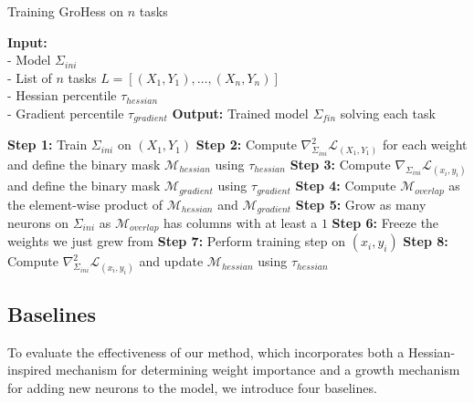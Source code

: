 \documentclass[11pt]{article}
\begin{document}
\begin{algorithm*}
    \caption{Training GroHess on $n$ tasks}
    \begin{algorithmic}[1]
    \State \textbf{Input:} \\
    - Model $\Sigma_{ini}$ \\ 
    - List of $n$ tasks $L = [(X_1,Y_1), \ldots, (X_n,Y_n)]$\\
    - Hessian percentile $\tau_{hessian}$ \\
    - Gradient percentile $\tau_{gradient}$
    \State \textbf{Output:} Trained model $\Sigma_{fin}$ solving each task
    \State
    
    \State \textbf{Step 1:} Train $\Sigma_{ini}$ on $(X_1,Y_1)$
    \State \textbf{Step 2:} Compute $\nabla^2_{\Sigma_{ini}} \mathcal{L}_{(X_1,Y_1)}$ for each weight and define the binary mask $\mathcal{M}_{hessian}$ using $\tau_{hessian}$  
                \State \textbf{Step 3:} Compute $\nabla_{\Sigma_{ini}} \mathcal{L}_{(x_i,y_i)}$ and define the binary mask $\mathcal{M}_{gradient}$ using $\tau_{gradient}$
                \State \textbf{Step 4:} Compute $\mathcal{M}_{overlap}$ as the element-wise product of $\mathcal{M}_{hessian}$ and $\mathcal{M}_{gradient}$
                \State \textbf{Step 5:} Grow as many neurons on $\Sigma_{ini}$ as $\mathcal{M}_{overlap}$ has columns with at least a $1$
                \State \textbf{Step 6:} Freeze the weights we just grew from
            \EndIf
            \State \textbf{Step 7:} Perform training step on $(x_i,y_i)$
        \EndFor
        \State \textbf{Step 8:} Compute $\nabla^2_{\Sigma_{ini}} \mathcal{L}_{(x_i,y_i)}$ and update $\mathcal{M}_{hessian}$ using $\tau_{hessian}$
    \EndFor
    \end{algorithmic}
\end{algorithm*}


\subsection{Baselines}



To evaluate the effectiveness of our method, which incorporates both a Hessian-inspired mechanism for determining weight importance and a growth mechanism for adding new neurons to the model, we introduce four baselines.
\end{document}

